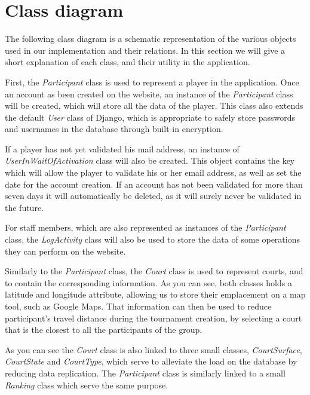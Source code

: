 \section{Class diagram}


The following class diagram is a schematic representation of the various
objects used in our implementation and their relations. In this section we will
give a short explanation of each class, and their utility in the application.\newline

First, the \textit{Participant} class is used to represent a player in the
application. Once an account as been created on the website, an instance
of the \textit{Participant} class will be created, which will store all
the data of the player. This class also extends the default \textit{User} class
of Django, which is appropriate to safely store passwords and usernames in
the database through built-in encryption.\newline

If a player has not yet validated his mail address, an instance of
\textit{UserInWaitOfActivation} class will also be created. This object
contains the key which will allow the player to validate his or her email
address, as well as set the date for the account creation. If an
account has not been validated for more than seven days it will automatically
be deleted, as it will surely never be validated in the future.\newline

For staff members, which are also represented as instances of the
\textit{Participant} class, the \textit{LogActivity} class will also be used
to store the data of some operations they can perform on the website. \newline

Similarly to the \textit{Participant} class, the \textit{Court} class is used
to represent courts, and to contain the corresponding information.
As you can see, both classes holds a latitude and longitude attribute,
allowing us to store their emplacement on a map tool, such as Google Maps.
That information can then be used to reduce participant's travel distance
during the tournament creation, by selecting a court that is the closest to
all the participants of the group. \newline

As you can see the \textit{Court} class is also linked to three small classes,
\textit{CourtSurface}, \textit{CourtState} and \textit{CourtType}, which serve
to alleviate the load on the database by reducing data replication.
The \textit{Participant} class is similarly linked to a small \textit{Ranking}
class which serve the same purpose. \newline

